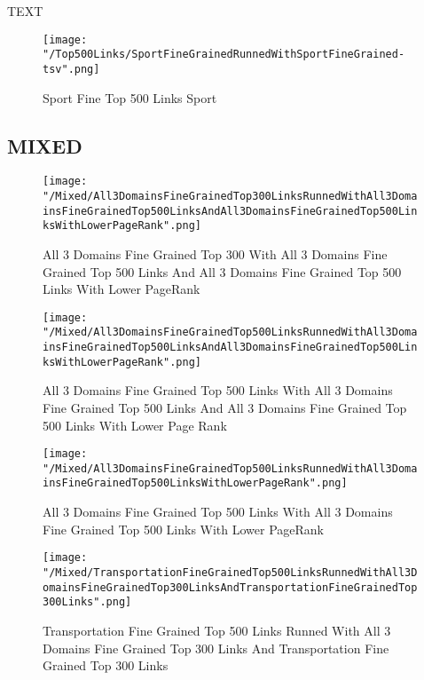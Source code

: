 \documentclass[thesis=M,english]{FITthesis}[2012/10/20]
\begin{document}
		TEXT	

	\begin{figure}\centering
		\texttt{[image: "/Top500Links/SportFineGrainedRunnedWithSportFineGrained-tsv".png]}
		\caption{Sport Fine Top 500 Links Sport}\label{}	
	\end{figure}			
	\subsection{MIXED}
		
	\begin{figure}\centering
		\texttt{[image: "/Mixed/All3DomainsFineGrainedTop300LinksRunnedWithAll3DomainsFineGrainedTop500LinksAndAll3DomainsFineGrainedTop500LinksWithLowerPageRank".png]}
		\caption{All 3 Domains Fine Grained Top 300 With All 3 Domains Fine Grained Top 500 Links And All 3 Domains Fine Grained Top 500 Links With Lower PageRank}\label{}
	\end{figure}
	
	\begin{figure}
		\texttt{[image: "/Mixed/All3DomainsFineGrainedTop500LinksRunnedWithAll3DomainsFineGrainedTop500LinksAndAll3DomainsFineGrainedTop500LinksWithLowerPageRank".png]}		\caption{All 3 Domains Fine Grained Top 500 Links  With All 3 Domains Fine Grained Top 500 Links And All 3 Domains Fine Grained Top 500 Links With Lower Page Rank}
	\end{figure}

	\begin{figure}
		\texttt{[image: "/Mixed/All3DomainsFineGrainedTop500LinksRunnedWithAll3DomainsFineGrainedTop500LinksWithLowerPageRank".png]}		
		\caption{All 3 Domains Fine Grained Top 500 Links With All 3 Domains Fine Grained Top 500 Links With Lower PageRank}
	\end{figure}

	\begin{figure}
		\texttt{[image: "/Mixed/TransportationFineGrainedTop500LinksRunnedWithAll3DomainsFineGrainedTop300LinksAndTransportationFineGrainedTop300Links".png]}		
		\caption{Transportation Fine Grained Top 500 Links Runned With All 3 Domains Fine Grained Top 300 Links And Transportation Fine Grained Top 300 Links}
	\end{figure}	
\end{document}
